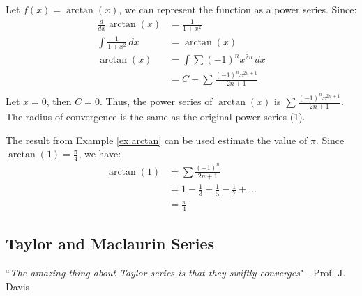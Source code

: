 \documentclass[11pt]{article}
\begin{document}
\begin{example}\label{ex:arctan}
    Let $f(x) = \arctan(x)$, we can represent the function as a power series. Since:
    \begin{align*}
        \frac{d}{dx} \arctan(x) &= \frac{1}{1+x^2} \\
        \int \frac{1}{1+x^2} \, dx &= \arctan(x) \\
        \arctan(x) &= \int \sum (-1)^n x^{2n} \, dx \\
        &= C + \sum \frac{(-1)^n x^{2n+1}}{2n+1} \\
    \end{align*}
    Let $x=0$, then $C = 0$. Thus, the power series of $\arctan(x)$ is $\sum \frac{(-1)^n x^{2n+1}}{2n+1}$. The radius of convergence is the same as the original power series (1). 
\end{example}
\begin{example}
    The result from Example \ref{ex:arctan} can be used estimate the value of $\pi$. Since $\arctan(1) = \frac{\pi}{4}$, we have:
    \begin{align*}
        \arctan(1) &= \sum \frac{(-1)^n}{2n+1} \\
        &= 1 - \frac{1}{3} + \frac{1}{5} - \frac{1}{7} + \ldots \\
        &= \frac{\pi}{4}
    \end{align*}
\end{example}
\subsection{Taylor and Maclaurin Series}
\begin{center}
    ``\textit{The amazing thing about Taylor series is that they swiftly converges}" - Prof. J. Davis
\end{center}
\end{document}
